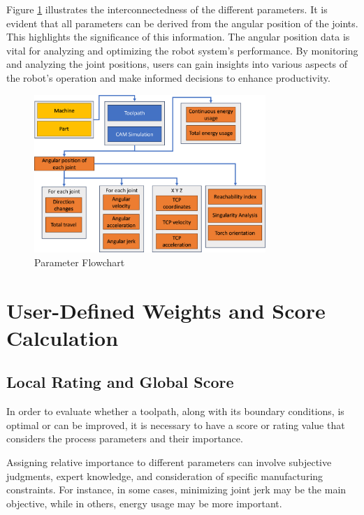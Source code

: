 Figure \ref{ParamsFlow} illustrates the interconnectedness of the different parameters. It is evident that all parameters can be derived from the angular position of the joints. This highlights the significance of this information. The angular position data is vital for analyzing and optimizing the robot system's performance. By monitoring and analyzing the joint positions, users can gain insights into various aspects of the robot's operation and make informed decisions to enhance productivity.




\begin{figure}[H]
	\centerline{\includegraphics[width=0.781\textwidth]{figures/Flow.png}}
	\caption{Parameter Flowchart}
	\label{ParamsFlow}
\end{figure}

\newpage

\section{User-Defined Weights and Score Calculation}\label{weights}
\subsection{Local Rating and Global Score}
In order to evaluate whether a toolpath, along with its boundary conditions, is optimal or can be improved, it is necessary to have a score or rating value that considers the process parameters and their importance.

Assigning relative importance to different parameters can involve subjective judgments, expert knowledge, and consideration of specific manufacturing constraints. For instance, in some cases, minimizing joint jerk may be the main objective, while in others, energy usage may be more important.

